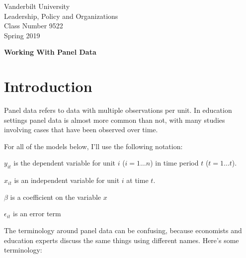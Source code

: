 \documentclass[12pt]{article}
\begin{document}
\thispagestyle{empty}%

\setlength{\parskip}{1ex plus 0.5ex minus 0.2ex}

\setcounter{secnumdepth}{-2}


\begin{flushleft}
Vanderbilt University\\Leadership, Policy and Organizations\\Class Number 9522\\ Spring 2019
\end{flushleft}

\begin{center}
\textbf{Working With Panel Data}
\end{center}

\section{Introduction}

Panel data refers to data with multiple observations per unit. In
education settings panel data is almost more common than not, with
many studies involving cases that have been observed over time.

For all of the models below, I'll use the following notation:

$y_{it}$ is the dependent variable for unit $i$ ($i=1 \ldots n$) in time period $t$ ($t= 1 \ldots t$). 

$x_{it}$ is an independent variable for unit $i$ at time $t$. 

$\beta$ is a coefficient on the variable $x$

$\epsilon_{it}$ is an error term


The terminology around panel data can be confusing, because economists
and education experts discuss the same things using different
names. Here's some terminology:
\end{document}
